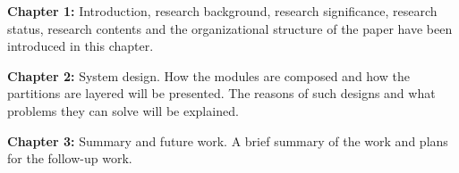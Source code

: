 \textbf{Chapter 1:} Introduction, research background, research significance, research status, research contents and the organizational structure of the paper have been introduced in this chapter.

\textbf{Chapter 2:} System design. How the modules are composed and how the partitions are layered will be presented. The reasons of such designs and what problems they can solve will be explained.

\textbf{Chapter 3:} Summary and future work. A brief summary of the work and plans for the follow-up work.

